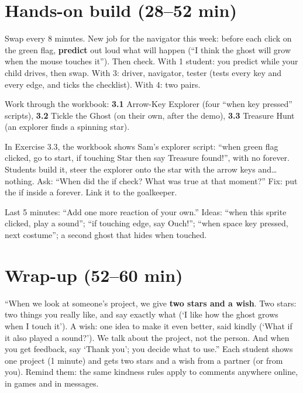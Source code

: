 \section{Hands-on build (28--52 min)}
\begin{pairroles}
Swap every 8 minutes. New job for the navigator this week: before each click on the green flag, \textbf{predict} out loud what will happen (\enquote{I think the ghost will grow when the mouse touches it}). Then check. With 1 student: you predict while your child drives, then swap. With 3: driver, navigator, tester (tests every key and every edge, and ticks the checklist). With 4: two pairs.
\end{pairroles}

Work through the workbook: \textbf{3.1} Arrow-Key Explorer (four \enquote{when key pressed} scripts), \textbf{3.2} Tickle the Ghost (on their own, after the demo), \textbf{3.3} Treasure Hunt (an explorer finds a spinning star).

\begin{bughunt}
In Exercise 3.3, the workbook shows Sam's explorer script: \enquote{when green flag clicked, go to start, if touching Star then say Treasure found!}, with no forever. Students build it, steer the explorer onto the star with the arrow keys and\ldots{} nothing. Ask: \enquote{When did the if check? What was true at that moment?} Fix: put the if inside a forever. Link it to the goalkeeper.
\end{bughunt}

\begin{freebuild}
Last 5 minutes: \enquote{Add one more reaction of your own.} Ideas: \enquote{when this sprite clicked, play a sound}; \enquote{if touching edge, say Ouch!}; \enquote{when space key pressed, next costume}; a second ghost that hides when touched.
\end{freebuild}

\section{Wrap-up (52--60 min)}
\begin{safety}
\enquote{When we look at someone's project, we give \textbf{two stars and a wish}. Two stars: two things you really like, and say exactly what (\enquote{I like how the ghost grows when I touch it}). A wish: one idea to make it even better, said kindly (\enquote{What if it also played a sound?}). We talk about the project, not the person. And when you get feedback, say \enquote{Thank you}; you decide what to use.} Each student shows one project (1 minute) and gets two stars and a wish from a partner (or from you).
Remind them: the same kindness rules apply to comments anywhere online, in games and in messages.
\end{safety}

